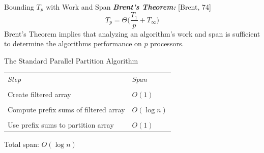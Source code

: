 \documentclass[xcolor=x11names, svgnames, rgb]{beamer}
\newcommand{\defn}[1]       {{\textit{\textbf{\boldmath #1}}}}
\newtheorem{defin}{Definition}
\begin{document}
\begin{frame}[t]{Bounding $T_p$ with Work and Span}
	\defn{Brent's Theorem:} [Brent, 74]
	$$T_p = \Theta\Big(\frac{T_1}{p}+T_\infty\Big)$$
	Brent's Theorem implies that analyzing an algorithm's work and span is sufficient to determine the algorithms performance on $p$ processors.
\end{frame}


\begin{frame}[t]{The Standard Parallel Partition Algorithm}
\begin{table}[]
\begin{tabular}{ll}
	\emph{Step}                                              & \emph{Span} \\\\
Create filtered array                             & $O(1)$            \\\\
Compute prefix sums of filtered array & $O(\log n)$       \\\\
Use prefix sums to partition array                & $O(1)$           
\end{tabular}
\end{table}
\vspace{10 mm}
Total span: $O(\log n)$
\end{frame}
\end{document}

